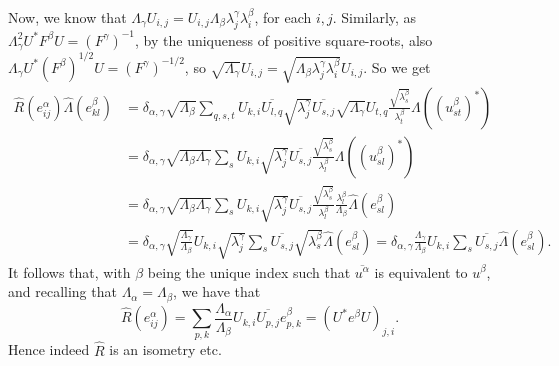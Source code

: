 \documentclass[twoside,a4paper,12pt]{article}
\theoremstyle{plain}
\theoremstyle{definition}
\begin{document}
Now, we know that $\Lambda_\gamma U_{i,j} =
U_{i,j} \Lambda_\beta \lambda^\gamma_j \lambda^\beta_i$, for each $i,j$.
Similarly, as $\Lambda^2_\gamma U^* F^\beta U = (F^\gamma)^{-1}$, by the
uniqueness of positive square-roots, also $\Lambda_\gamma U^* (F^\beta)^{1/2} U
= (F^\gamma)^{-1/2}$, so $\sqrt{\Lambda_\gamma} U_{i,j} =
\sqrt{\Lambda_\beta \lambda^\gamma_j \lambda^\beta_i} U_{i,j}$.
So we get
\begin{align*} \hat R(e^\alpha_{ij}) \hat\Lambda(e^\beta_{kl})
&= \delta_{\alpha,\gamma} \sqrt{\Lambda_\beta} \sum_{q,s,t}
   U_{k,i} \overline{U_{l,q}}
   \sqrt{\lambda^\gamma_j} \overline{U_{s,j}}
   \sqrt{\Lambda_\gamma} U_{t,q}
   \frac{\sqrt{\lambda^\beta_s}}{\lambda^\beta_t}
   \Lambda((u^\beta_{st})^*) \\
&= \delta_{\alpha,\gamma} \sqrt{\Lambda_\beta\Lambda_\gamma} \sum_s
   U_{k,i} \sqrt{\lambda^\gamma_j} \overline{U_{s,j}}
   \frac{\sqrt{\lambda^\beta_s}}{\lambda^\beta_l}
   \Lambda((u^\beta_{sl})^*) \\
&= \delta_{\alpha,\gamma} \sqrt{\Lambda_\beta\Lambda_\gamma} \sum_s
   U_{k,i} \sqrt{\lambda^\gamma_j} \overline{U_{s,j}}
   \frac{\sqrt{\lambda^\beta_s}}{\lambda^\beta_l}
   \frac{\lambda^\beta_l}{\Lambda_\beta}
   \hat\Lambda(e^\beta_{sl}) \\
&= \delta_{\alpha,\gamma} \sqrt{\frac{\Lambda_\gamma}{\Lambda_\beta}}
   U_{k,i} \sqrt{\lambda^\gamma_j} 
   \sum_s \overline{U_{s,j}} \sqrt{\lambda^\beta_s}
   \hat\Lambda(e^\beta_{sl})
= \delta_{\alpha,\gamma} \frac{\Lambda_\gamma}{\Lambda_\beta}
   U_{k,i} \sum_s
   \overline{U_{s,j}}
   \hat\Lambda(e^\beta_{sl}).
\end{align*}
It follows that, with $\beta$ being the unique index such that
$\overline{u^\alpha}$ is equivalent to $u^\beta$, and recalling that
$\Lambda_\alpha = \Lambda_\beta$, we have that
\[ \hat R(e^\alpha_{ij}) = \sum_{p,k} \frac{\Lambda_\alpha}{\Lambda_\beta}
U_{k,i} \overline{U_{p,j}} e^\beta_{p,k}
= (U^* e^\beta U)_{j,i}. \]
Hence indeed $\hat R$ is an isometry etc.
\end{document}
